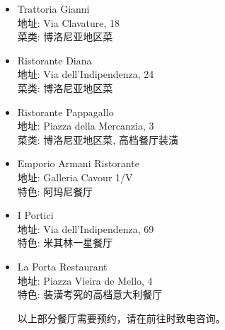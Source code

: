 \begin{itemize}
\item Trattoria Gianni\\
地址: Via Clavature, 18\\
菜类: 博洛尼亚地区菜

\item Ristorante Diana\\
地址: Via dell'Indipendenza, 24\\
菜类: 博洛尼亚地区菜

\item Ristorante Pappagallo\\
地址: Piazza della Mercanzia, 3\\
菜类: 博洛尼亚地区菜, 高档餐厅装潢

\item Emporio Armani Ristorante\\
地址: Galleria Cavour 1/V\\
特色: 阿玛尼餐厅

\item I Portici\\
地址: Via dell'Indipendenza, 69\\
特色: 米其林一星餐厅

\item La Porta Restaurant\\
地址: Piazza Vieira de Mello, 4\\
特色: 装潢考究的高档意大利餐厅


以上部分餐厅需要预约，请在前往时致电咨询。
\end{itemize}

